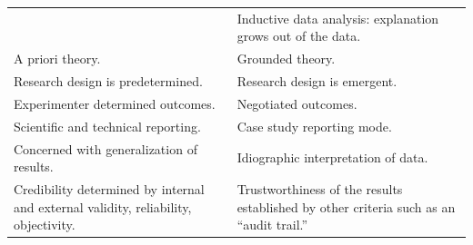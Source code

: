 \documentclass[
  english,
]{book}
\begin{document}
\begin{longtable}[]{@{}ll@{}}
\begin{minipage}[t]{0.47\columnwidth}
\end{minipage} & \begin{minipage}[t]{0.47\columnwidth}\raggedright
Inductive data analysis: explanation grows out of the data.\strut
\end{minipage}\tabularnewline
\begin{minipage}[t]{0.47\columnwidth}\raggedright
A priori theory.\strut
\end{minipage} & \begin{minipage}[t]{0.47\columnwidth}\raggedright
Grounded theory.\strut
\end{minipage}\tabularnewline
\begin{minipage}[t]{0.47\columnwidth}\raggedright
Research design is predetermined.\strut
\end{minipage} & \begin{minipage}[t]{0.47\columnwidth}\raggedright
Research design is emergent.\strut
\end{minipage}\tabularnewline
\begin{minipage}[t]{0.47\columnwidth}\raggedright
Experimenter determined outcomes.\strut
\end{minipage} & \begin{minipage}[t]{0.47\columnwidth}\raggedright
Negotiated outcomes.\strut
\end{minipage}\tabularnewline
\begin{minipage}[t]{0.47\columnwidth}\raggedright
Scientific and technical reporting.\strut
\end{minipage} & \begin{minipage}[t]{0.47\columnwidth}\raggedright
Case study reporting mode.\strut
\end{minipage}\tabularnewline
\begin{minipage}[t]{0.47\columnwidth}\raggedright
Concerned with generalization of results.\strut
\end{minipage} & \begin{minipage}[t]{0.47\columnwidth}\raggedright
Idiographic interpretation of data.\strut
\end{minipage}\tabularnewline
\begin{minipage}[t]{0.47\columnwidth}\raggedright
Credibility determined by internal and external validity, reliability, objectivity.\strut
\end{minipage} & \begin{minipage}[t]{0.47\columnwidth}\raggedright
Trustworthiness of the results established by other criteria such as an ``audit trail.''\strut
\end{minipage}\tabularnewline
\bottomrule
\end{longtable}
\end{document}
